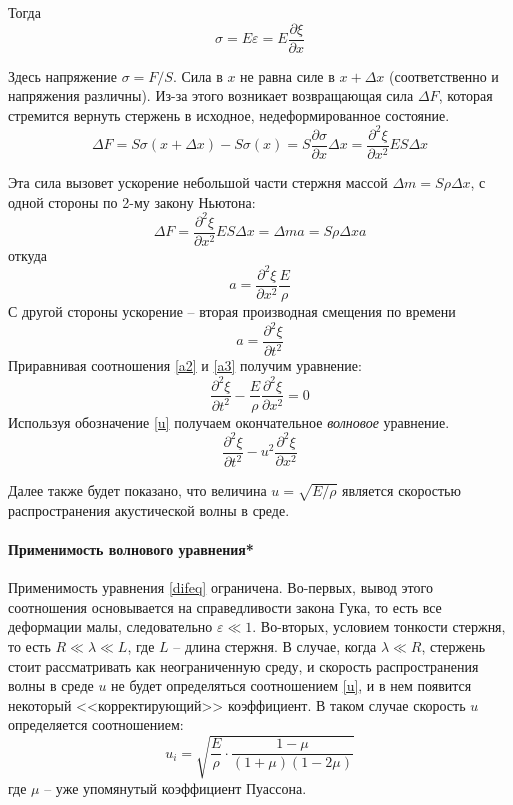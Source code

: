 \documentclass[a4paper,12pt]{article}
\begin{document}
	Тогда 
	\begin{equation}
		\sigma = E \varepsilon = E \frac{\partial \xi}{\partial x}
	\end{equation}
	
	Здесь напряжение $\sigma = F/S$. Сила в $x$ не равна силе в $x+\Delta x$ (соответственно и напряжения различны). Из-за этого возникает возвращающая сила $\Delta F$, которая стремится вернуть стержень в исходное, недеформированное состояние.\\
	
	\begin{equation}
		\label{delta f}
		\Delta F = S\sigma(x+\Delta x)-S\sigma(x)=S\frac{\partial\sigma}{\partial x}\Delta x=\frac{\partial^2\xi}{\partial x^2}ES\Delta x
	\end{equation}
	
	Эта сила вызовет ускорение небольшой части стержня массой $\Delta m = S\rho\Delta x$, с одной стороны по 2-му закону Ньютона:
	\[
		\Delta F = \frac{\partial^2\xi}{\partial x^2}ES\Delta x=\Delta m a = S\rho\Delta x a
	\]
	откуда
	\begin{equation}
		\label{a2}
		a = \frac{\partial^2\xi}{\partial x^2}\frac{E}{\rho}
	\end{equation}
	С другой стороны ускорение -- вторая производная смещения по времени
	\begin{equation}
		\label{a3}
		a = \frac{\partial^2\xi}{\partial t^2}
	\end{equation}
	Приравнивая соотношения \eqref{a2} и \eqref{a3} получим уравнение:
	\[
		\frac{\partial^2\xi}{\partial t^2}-\frac{E}{\rho} \frac{\partial^2\xi}{\partial x^2} = 0
	\]
	Используя обозначение \eqref{u} получаем окончательное \textit{волновое} уравнение.
	\begin{equation}
		\label{difeq}
		\frac{\partial^2\xi}{\partial t^2}-u^2\frac {\partial^2\xi}{\partial x^2}
	\end{equation}
	
	Далее также будет показано, что величина $u=\sqrt{E/\rho}$ является скоростью распространения акустической волны в среде.\\
	
	\paragraph{Применимость волнового уравнения*}
	
	Применимость уравнения \eqref{difeq} ограничена. Во-первых, вывод этого соотношения основывается на справедливости закона Гука, то есть все деформации малы, следовательно $\varepsilon \ll 1$.
	Во-вторых, условием тонкости стержня, то есть $R \ll \lambda \ll L$, где $L$ -- длина стержня.
	В случае, когда $\lambda \ll R$, стержень стоит рассматривать как неограниченную среду, и скорость распространения волны в среде $u$ не будет определяться соотношением \eqref{u}, и в нем появится некоторый <<корректирующий>> коэффициент.
	В таком случае скорость $u$ определяется соотношением:
	\[
		u_i=\sqrt{\frac{E}{\rho}\cdot \frac{1-\mu}{(1+\mu)(1-2\mu)}}
	\]
	где $\mu$ -- уже упомянутый коэффициент Пуассона.\\
	
\end{document}
